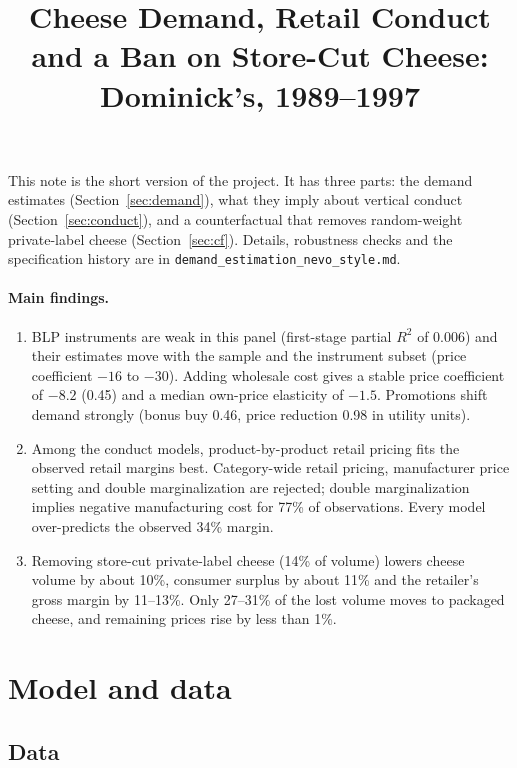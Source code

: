 \documentclass[11pt]{article}
\title{Cheese Demand, Retail Conduct and a Ban on Store-Cut Cheese:\\
Dominick's, 1989--1997}
\author{}
\date{}
\newcommand{\code}[1]{\texttt{#1}}
\begin{document}
\maketitle

This note is the short version of the project. It has three parts: the demand estimates
(Section~\ref{sec:demand}), what they imply about vertical conduct
(Section~\ref{sec:conduct}), and a counterfactual that removes random-weight private-label
cheese (Section~\ref{sec:cf}). Details, robustness checks and the specification history are in
\code{demand\_estimation\_nevo\_style.md}.

\paragraph{Main findings.}
\begin{enumerate}
  \item BLP instruments are weak in this panel (first-stage partial $R^2$ of 0.006) and their
        estimates move with the sample and the instrument subset (price coefficient $-16$ to
        $-30$). Adding wholesale cost gives a stable price coefficient of $-8.2$ (0.45) and a
        median own-price elasticity of $-1.5$. Promotions shift demand strongly (bonus buy
        0.46, price reduction 0.98 in utility units).
  \item Among the conduct models, product-by-product retail pricing fits the observed retail
        margins best. Category-wide retail pricing, manufacturer price setting and double
        marginalization are rejected; double marginalization implies negative manufacturing
        cost for 77\% of observations. Every model over-predicts the observed 34\% margin.
  \item Removing store-cut private-label cheese (14\% of volume) lowers cheese volume by
        about 10\%, consumer surplus by about 11\% and the retailer's gross margin by
        11--13\%. Only 27--31\% of the lost volume moves to packaged cheese, and remaining
        prices rise by less than 1\%.
\end{enumerate}

\section{Model and data}\label{sec:model}

\subsection{Data}
\end{document}
